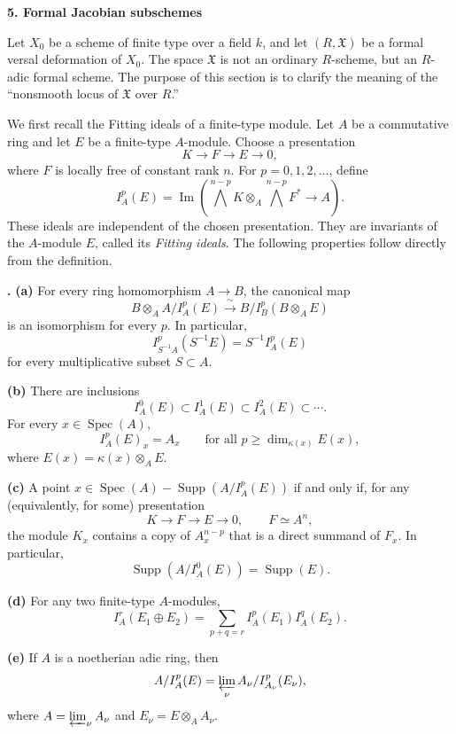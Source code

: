 \bigskip
\noindent\textbf{5. Formal Jacobian subschemes}

\medskip
Let $X_0$ be a scheme of finite type over a field $k$, and let
$(R,\mathfrak X)$ be a formal versal deformation of $X_0$. The space
$\mathfrak X$ is not an ordinary $R$-scheme, but an $R$-adic formal
scheme. The purpose of this section is to clarify the meaning of the
``nonsmooth locus of $\mathfrak X$ over $R$.''

We first recall the Fitting ideals of a finite-type module. Let $A$ be
a commutative ring and let $E$ be a finite-type $A$-module. Choose a
presentation
\[
K\longrightarrow F\longrightarrow E\longrightarrow0,
\]
where $F$ is locally free of constant rank $n$. For
$p=0,1,2,\ldots$, define
\[
I_A^p(E)=\operatorname{Im}\left(
 \bigwedge^{n-p}K\otimes_A\bigwedge^{n-p}F^*
 \longrightarrow A\right).
\]
These ideals are independent of the chosen presentation. They are
invariants of the $A$-module $E$, called its \emph{Fitting ideals}.
The following properties follow directly from the definition.

\medskip
\noindent\textbf{.}
\textbf{(a)} For every ring homomorphism $A\longrightarrow B$, the
canonical map
\[
B\otimes_A A/I_A^p(E)
\xrightarrow{\ \sim\ }
B/I_B^p(B\otimes_AE)
\]
is an isomorphism for every $p$. In particular,
\[
I_{S^{-1}A}^p(S^{-1}E)=S^{-1}I_A^p(E)
\]
for every multiplicative subset $S\subset A$.


\smallskip
\noindent\textbf{(b)} There are inclusions
\[
I_A^0(E)\subset I_A^1(E)\subset I_A^2(E)\subset\cdots.
\]
For every $x\in\operatorname{Spec}(A)$,
\[
I_A^p(E)_x=A_x
\qquad\text{for all }p\geq\dim_{\kappa(x)}E(x),
\]
where $E(x)=\kappa(x)\otimes_AE$.

\smallskip
\noindent\textbf{(c)} A point
$x\in\operatorname{Spec}(A)-\operatorname{Supp}(A/I_A^p(E))$ if and
only if, for any (equivalently, for some) presentation
\[
K\longrightarrow F\longrightarrow E\longrightarrow0,
\qquad F\simeq A^n,
\]
the module $K_x$ contains a copy of $A_x^{n-p}$ that is a direct
summand of $F_x$. In particular,
\[
\operatorname{Supp}(A/I_A^0(E))=\operatorname{Supp}(E).
\]

\smallskip
\noindent\textbf{(d)} For any two finite-type $A$-modules,
\[
I_A^r(E_1\oplus E_2)
=\sum_{p+q=r}I_A^p(E_1)I_A^q(E_2).
\]

\smallskip
\noindent\textbf{(e)} If $A$ is a noetherian adic ring, then
\[
A/I_A^p(E)=\varprojlim_\nu A_\nu/I_{A_\nu}^p(E_\nu),
\]
where $A=\varprojlim_\nu A_\nu$ and $E_\nu=E\otimes_AA_\nu$.

